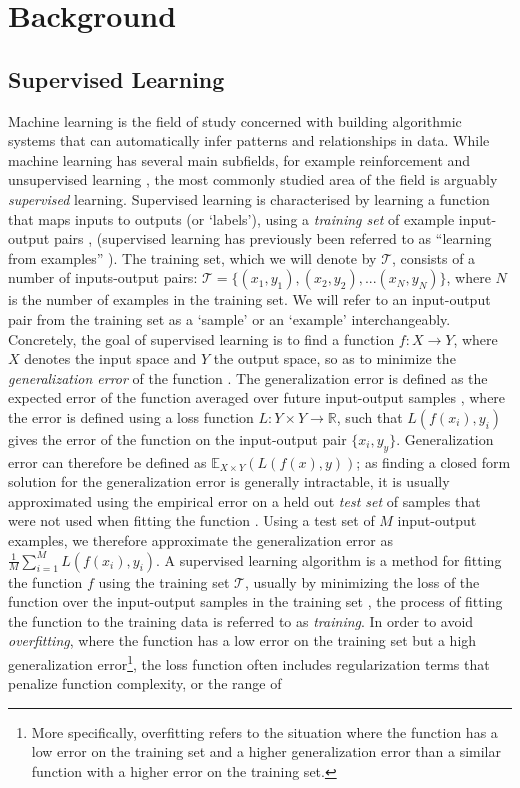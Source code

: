 \chapter{Background}\label{ch:background}

\section{Supervised Learning}
Machine learning is the field of study concerned with building algorithmic systems that can automatically infer patterns and relationships in data. While machine learning has several main subfields, for example reinforcement \cite{sutton1998introduction} and unsupervised learning \cite{hastie2009unsupervised}, the most commonly studied area of the field is arguably \textit{supervised} learning. Supervised learning is characterised by learning a function that maps inputs to outputs (or `labels'), using a \textit{training set} of example input-output pairs \cite{Witten2011}, (supervised learning has previously been referred to as ``learning from examples'' \cite{cohn1994improving}). The training set, which we will denote by $\mathcal{T}$, consists of a number of inputs-output pairs: $\mathcal{T} = \{(x_1,y_1),(x_2,y_2),...(x_N,y_N)\}$, where $N$ is the number of examples in the training set. We will refer to an input-output pair from the training set as a `sample' or an `example' interchangeably. Concretely, the goal of supervised learning is to find a function $f : X \rightarrow Y$, where $X$ denotes the input space and $Y$ the output space, so as to minimize the \textit{generalization error} of the function \cite{murphy2012machine}. The generalization error is defined as the expected error of the function averaged over future input-output samples \cite{murphy2012machine}, where the error is defined using a loss function $L:Y \times Y \rightarrow \mathbb{R}$, such that $L(f(x_i),y_i)$ gives the error of the function on the input-output pair $\{x_i,y_y\}$. Generalization error can therefore be defined as $\mathbb{E}_{X\times Y}(L(f(x),y))$; as finding a closed form solution for the generalization error is generally intractable, it is usually approximated using the empirical error on a held out \textit{test set} of samples that were not used when fitting the function \cite{murphy2012machine}. Using a test set of $M$ input-output examples, we therefore approximate the generalization error as $\frac{1}{M}\sum_{i=1}^{M} L(f(x_i),y_i)$. A supervised learning algorithm is a method for fitting the function $f$ using the training set $\mathcal{T}$, usually by minimizing the loss of the function over the input-output samples in the training set \cite{murphy2012machine}, the process of fitting the function to the training data is referred to as \textit{training}. In order to avoid \textit{overfitting}, where the function has a low error on the training set but a high generalization error\footnote{More specifically, overfitting refers to the situation where the function has a low error on the training set and a higher generalization error than a similar function with a higher error on the training set.}, the loss function often includes regularization terms that penalize function complexity, or the range of 